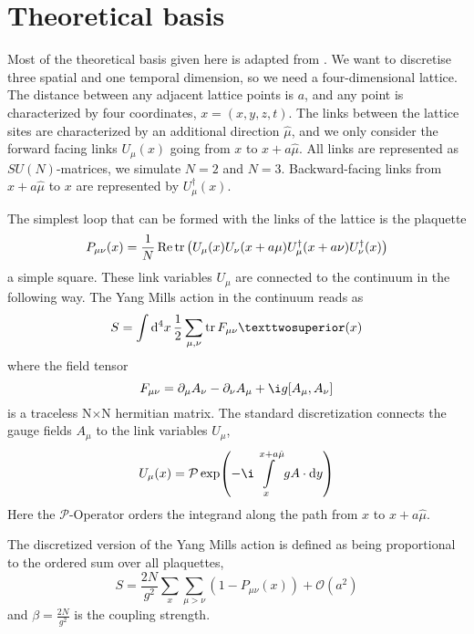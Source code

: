 \documentclass[%
 reprint,
 amsmath,amssymb,
 aps,
]{revtex4-1}
\renewcommand{\Re}{\operatorname{Re}}
\begin{document}
\section{Theoretical basis}

Most of the theoretical basis given here is adapted from \citet{lepagelqcd}. We want to discretise three spatial and one temporal dimension, so we need a four-dimensional lattice. The distance between any adjacent lattice points is $a$, and any point is characterized by four coordinates, $x=(x,y,z,t)$. The links between the lattice sites are characterized by an additional direction $\hat{\mu}$, and we only consider the forward facing links $U_\mu(x)$ going from $x$ to $x+a\hat{\mu}$. All links are represented as $SU(N)$-matrices, we simulate $N=2$ and $N=3$. Backward-facing links from $x+a\hat{\mu}$ to $x$ are represented by $U_\mu^\dagger(x)$.

The simplest loop that can be formed with the links of the lattice is the plaquette \[P_{\mu\nu}(x)=\frac{1}{N}\Re\tr\left(U_\mu(x)U_\nu(x+a\mu)U_\mu^\dagger(x+a\nu)U^\dagger_\nu(x)\right)\] a simple square. These link variables $U_\mu$ are connected to the continuum in the following way. The Yang Mills action in the continuum reads as \[S=\int\dd{^4x}\dfrac{1}{2}\sum\limits_{\mu,\nu}\tr F_{\mu\nu}²(x)\] where the field tensor\[F_{\mu\nu}=\partial_\mu A_\nu-\partial_\nu A_\mu+\i g [A_\mu,A_\nu]\] is a traceless N$\times$N hermitian matrix. The standard discretization connects the gauge fields $A_\mu$ to the link variables $U_\mu$, \[U_\mu(x)=\mathcal{P}\exp(-\i\int\limits_{x}^{x+a\hat{\mu}}g A\cdot\dd{y})\]
Here the $\mathcal{P}$-Operator orders the integrand along the path from $x$ to $x+a\hat{\mu}$.

The discretized version of the Yang Mills action is defined as being proportional to the ordered sum over all plaquettes, \[S=\frac{2N}{g^2}\sum_{x}\sum_{\mu>\nu}\left(1-P_{\mu\nu}(x)\right)+\mathcal{O}(a^2)\]
and $\beta=\frac{2N}{g^2}$ is the coupling strength. 


%
%
\end{document}
